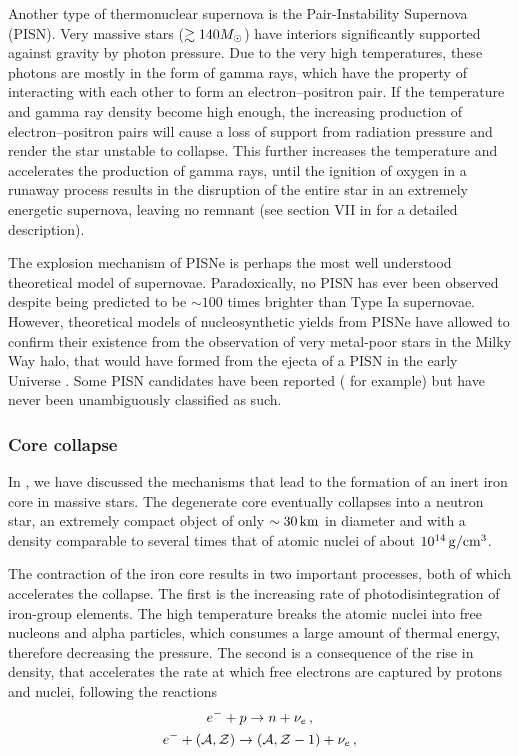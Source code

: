 Another type of thermonuclear supernova is the Pair-Instability Supernova (PISN). Very massive stars (\(\gtrsim 140M_{\odot}\)) have interiors significantly supported against gravity by photon pressure. Due to the very high temperatures, these photons are mostly in the form of gamma rays, which have the property of interacting with each other to form an electron--positron pair. If the temperature and gamma ray density become high enough, the increasing production of electron--positron pairs will cause a loss of support from radiation pressure and render the star unstable to collapse. This further increases the temperature and accelerates the production of gamma rays, until the ignition of oxygen in a runaway process results in the disruption of the entire star in an extremely energetic supernova, leaving no remnant (see section VII in \citealt{Woosley2002} for a detailed description).

The explosion mechanism of PISNe is perhaps the most well understood theoretical model of supernovae. Paradoxically, no PISN has ever been observed despite being predicted to be \(\sim100\) times brighter than Type Ia supernovae. However, theoretical models of nucleosynthetic yields from PISNe have allowed to confirm their existence from the observation of very metal-poor stars in the Milky Way halo, that would have formed from the ejecta of a PISN in the early Universe \citep{Xing2023}. Some PISN candidates have been reported (\citealt{Schulze2024, GalYam2009} for example) but have never been unambiguously classified as such.

\subsubsection{Core collapse} \label{sec:ccsne}

In , we have discussed the mechanisms that lead to the formation of an inert iron core in massive stars. The degenerate core eventually collapses into a neutron star, an extremely compact object of only \(\sim30\,\mathrm{km}\) in diameter and with a density comparable to several times that of atomic nuclei of about \(10^{14}\,\mathrm{g/cm^3}\).

The contraction of the iron core results in two important processes, both of which accelerates the collapse. The first is the increasing rate of photodisintegration of iron-group elements. The high temperature breaks the atomic nuclei into free nucleons and alpha particles, which consumes a large amount of thermal energy, therefore decreasing the pressure. The second is a consequence of the rise in density, that accelerates the rate at which free electrons are captured by protons and nuclei, following the reactions
\begin{gather}
    e^{-} + p \rightarrow n + \nu_e \,\mathrm{,} \label{eq:nu_e} \\
    e^{-} + (\mathcal{A}, \mathcal{Z}) \rightarrow (\mathcal{A}, \mathcal{Z} - 1) + \nu_e \,\mathrm{,} \label{eq:anu_e}
\end{gather}

